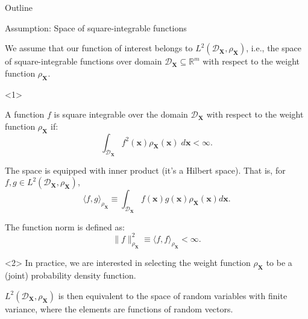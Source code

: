 \documentclass[english,aspectratio=169]{beamer}
\let\tempone\itemize
\let\temptwo\enditemize
\renewenvironment{itemize}{\tempone\addtolength{\itemsep}{0.35\baselineskip}}{\temptwo}
\renewcommand{\emph}[1]{\textcolor[HTML]{006d2c}{\fontseries{sb}\selectfont #1}}
\begin{document}
\begin{frame}{Outline}
  \tableofcontents[currentsection]
\end{frame}

\begin{frame}[fragile]{Assumption: Space of square-integrable functions}
\small

We assume that our function of interest belongs
to $L^2(\mathcal{D}_{\boldsymbol{X}}, \rho_{\boldsymbol{X}})$, i.e., the space of square-integrable functions
over domain $\mathcal{D}_{\boldsymbol{X}} \subseteq \mathbb{R}^m$ with respect to the weight function $\rho_{\boldsymbol{X}}$.

\vspace{1.5em}

\begin{onlyenv}<1>  
\begin{itemize}
  \item A function $f$ is square integrable over the domain $\mathcal{D}_{\boldsymbol{X}}$ with respect to the weight function $\rho_{\boldsymbol{X}}$ if:
  \begin{equation*}
    \int_{\mathcal{D}_{\boldsymbol{X}}} f^2 (\boldsymbol{x}) \rho_{\boldsymbol{X}}(\boldsymbol{x}) \; d\boldsymbol{x} < \infty.
  \end{equation*}
  \item The space is equipped with inner product (it's a Hilbert space). That is, for $f, g \in L^2(\mathcal{D}_{\boldsymbol{X}}, \rho_{\boldsymbol{X}})$,
    \begin{equation*}
      \langle f, g \rangle_{\rho_{\bm{X}}} \equiv \int_{\mathcal{D}_{\bm{X}}} f(\bm{x}) g(\bm{x}) \rho_{\bm{X}}(\bm{x}) d\bm{x}.
    \end{equation*}
  \item The function norm is defined as:
  \begin{equation*}
    \lVert f \rVert^2_{\rho_{\bm{X}}} \equiv \langle f, f \rangle_{\rho_{\bm{X}}} < \infty.
  \end{equation*} 
\end{itemize}
\end{onlyenv}

\begin{exampleblock}<2>{}
  In practice, we are interested in selecting the weight function $\rho_{\boldsymbol{X}}$
  to be a \emph{(joint) probability density function}.

  \vspace{0.5em}

  $L^2(\mathcal{D}_{\boldsymbol{X}}, \rho_{\boldsymbol{X}})$ is then equivalent to
  the space of random variables with \emph{finite variance},
  where the elements are functions of random vectors.
\end{exampleblock}

\end{frame}
\end{document}

